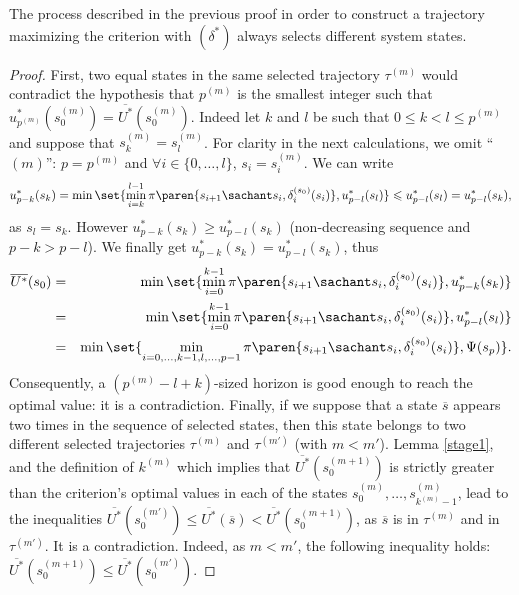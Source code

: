 \begin{Lemma} \label{diffstates}
The process described in the previous proof 
in order to construct a trajectory maximizing the criterion 
with $(\delta^*)$ always selects different system states.
\end{Lemma}
\begin{proof}
First, two equal states in the same selected trajectory $\tau^{(m)}$ 
would contradict the hypothesis 
that $p^{(m)}$ is the smallest integer 
such that $u^*_{p^{(m)}}(s^{(m)}_0)=\overline{U^*}(s^{(m)}_0)$. 
Indeed let $k$ and $l$ be such that $0 \leqslant k < l \leqslant p^{(m)}$ 
and suppose that $s^{(m)}_k=s^{(m)}_l$. 
For clarity in the next calculations, we omit ``$(m)$'': 
$p=p^{(m)}$ and $\forall i \in \{ 0, \ldots, l \}$, 
$s_i=s^{(m)}_i$. We can write 
\[  u_{p-k}^*(s_k) 
= \min \set{\min_{i=k}^{l-1} 
\pi \paren{s_{i+1} \sachant s_i, \delta^{(s_0)}_i(s_i) }, u_{p-l}^*(s_l) } \leqslant u_{p-l}^*(s_l) = u_{p-l}^*(s_k), \]
as $s_l=s_k$. 
However $u_{p-k}^*(s_k) \geqslant u_{p-l}^*(s_k) $ 
(non-decreasing sequence and $p-k>p-l$).  
We finally get $u_{p-k}^*(s_k) = u_{p-l}^*(s_k)$, thus
\begin{eqnarray*}
\overline{U^*}(s_0) &=& \min \set{ \min_{i=0}^{k-1} \pi \paren{s_{i+1} \sachant s_i, \delta^{(s_0)}_i(s_i) }, u_{p-k}^*(s_k) } \\
&=& \min \set{ \min_{i=0}^{k-1} \pi \paren{s_{i+1} \sachant s_i, \delta^{(s_0)}_i(s_i) }, u_{p-l}^*(s_l) } \\
&=& \min \set{ \min_{i=0,\ldots,k-1,l,\ldots,p-1 } \pi \paren{s_{i+1} \sachant s_i, \delta^{(s_0)}_i(s_i) }, \Psi(s_{p}) }. 
\end{eqnarray*}
Consequently, a $(p^{(m)}-l+k)$-sized horizon 
is good enough to reach the optimal value:
 it is a contradiction. 
Finally, if we suppose that a state $\overline{s}$ 
appears two times in the sequence of selected states, 
then this state belongs to two different selected trajectories 
$\tau^{(m)}$ and $\tau^{(m')}$ (with $m<m'$). 
Lemma \ref{stage1}, and the definition of $k^{(m)}$ 
which implies that $\overline{U^*}(s^{(m+1)}_0)$ 
is strictly greater than the criterion's 
optimal values in each of the states $s^{(m)}_0,\ldots,s^{(m)}_{k^{(m)}-1}$,
lead to the inequalities $\overline{U^*}(s_0^{(m')}) 
\leqslant \overline{U^*}(\overline{s}) < \overline{U^*}(s^{(m+1)}_0)$,
as $\overline{s}$ is in $\tau^{(m)}$ and in $\tau^{(m')}$. 
It is a contradiction.
Indeed, as $m<m'$, 
the following inequality holds:
$\overline{U^*}(s_0^{(m+1)}) \leqslant \overline{U^*}(s_0^{(m')})$. 
\end{proof}
